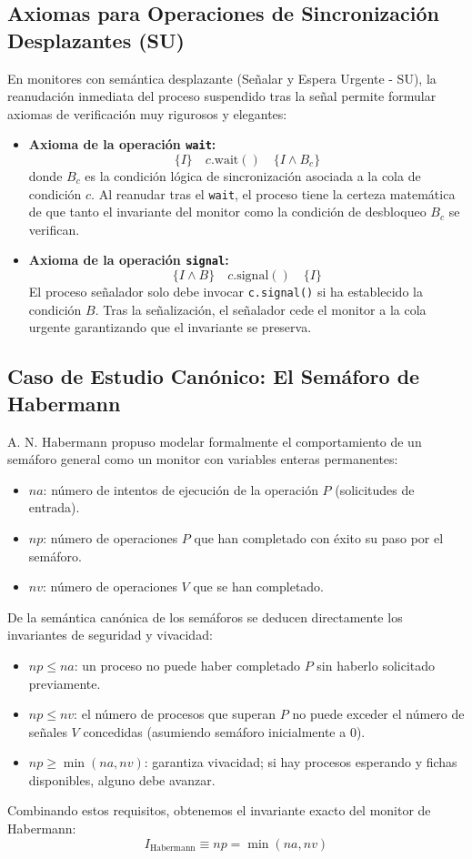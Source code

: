 \subsection{Axiomas para Operaciones de Sincronización Desplazantes (SU)}
En monitores con semántica desplazante (Señalar y Espera Urgente - SU), la reanudación inmediata del proceso suspendido tras la señal permite formular axiomas de verificación muy rigurosos y elegantes:
\begin{itemize}[leftmargin=*]
    \item \textbf{Axioma de la operación \texttt{wait}:}
    \[
    \{I\} \quad c.\text{wait}() \quad \{I \land B_c\}
    \]
    donde $B_c$ es la condición lógica de sincronización asociada a la cola de condición $c$. Al reanudar tras el \texttt{wait}, el proceso tiene la certeza matemática de que tanto el invariante del monitor como la condición de desbloqueo $B_c$ se verifican.
    \item \textbf{Axioma de la operación \texttt{signal}:}
    \[
    \{I \land B\} \quad c.\text{signal}() \quad \{I\}
    \]
    El proceso señalador solo debe invocar \texttt{c.signal()} si ha establecido la condición $B$. Tras la señalización, el señalador cede el monitor a la cola urgente garantizando que el invariante se preserva.
\end{itemize}

\subsection{Caso de Estudio Canónico: El Semáforo de Habermann}
A. N. Habermann propuso modelar formalmente el comportamiento de un semáforo general como un monitor con variables enteras permanentes:
\begin{itemize}[leftmargin=*]
    \item $na$: número de intentos de ejecución de la operación $P$ (solicitudes de entrada).
    \item $np$: número de operaciones $P$ que han completado con éxito su paso por el semáforo.
    \item $nv$: número de operaciones $V$ que se han completado.
\end{itemize}

De la semántica canónica de los semáforos se deducen directamente los invariantes de seguridad y vivacidad:
\begin{itemize}[leftmargin=*]
    \item $np \le na$: un proceso no puede haber completado $P$ sin haberlo solicitado previamente.
    \item $np \le nv$: el número de procesos que superan $P$ no puede exceder el número de señales $V$ concedidas (asumiendo semáforo inicialmente a 0).
    \item $np \ge \min(na, nv)$: garantiza vivacidad; si hay procesos esperando y fichas disponibles, alguno debe avanzar.
\end{itemize}
Combinando estos requisitos, obtenemos el invariante exacto del monitor de Habermann:
\[
I_{\text{Habermann}} \equiv np = \min(na, nv)
\]

